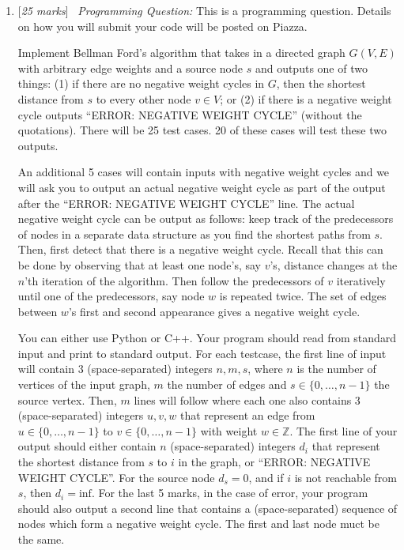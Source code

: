 \documentclass[11pt]{article}
\newcommand{\Q}[1]{\medskip\item {[{\em #1 marks\/}]}\ }
\begin{document}
\begin{enumerate}

\Q{25} {\em Programming Question:} This is a programming question. Details on how you will submit your code will be posted on Piazza.

Implement Bellman Ford's algorithm that takes in a directed graph $G(V, E)$ with arbitrary edge weights and a source node $s$ and outputs one of two things: (1) if there are no negative weight cycles in $G$, then the shortest distance from $s$ to every other node $v \in V$; or (2) if there is a negative weight cycle outputs ``ERROR: NEGATIVE WEIGHT CYCLE'' (without the quotations). There will be 25 test cases. 20 of these cases will test these two outputs. 

An additional 5 cases will contain inputs with negative weight cycles and we will ask you to output an actual negative weight cycle as part of the output after the ``ERROR: NEGATIVE WEIGHT CYCLE'' line. The actual negative weight cycle can be output as follows: keep track of the predecessors of nodes in a separate data structure as you find the shortest paths from $s$. Then, first detect that there is a negative weight cycle. Recall that this can be done by observing that at least one node's, say $v$'s, distance changes at the $n$'th iteration of the algorithm. Then follow the predecessors of $v$ iteratively until one of the predecessors, say node $w$ is repeated twice. The set of edges between $w$'s first and second appearance gives a negative weight cycle.

You can either use Python or C++. Your program should read from standard input and print to standard output. For each testcase, the first line of input will contain 3 (space-separated) integers $n, m, s$, where $n$ is the number of vertices of the input graph, $m$ the number of edges and $s\in\{0,\ldots ,n-1\}$ the source vertex. Then, $m$ lines will follow where each one also contains 3 (space-separated) integers $u, v, w$ that represent an edge from $u\in\{0,\ldots ,n-1\}$ to $v\in\{0,\ldots ,n-1\}$ with weight $w\in\mathbb{Z}$. The first line of your output should either contain $n$ (space-separated) integers $d_i$ that represent the shortest distance from $s$ to $i$ in the graph, or ``ERROR: NEGATIVE WEIGHT CYCLE''. For the source node $d_s=0$, and if $i$ is not reachable from $s$, then $d_i=\text{inf}$. For the last 5 marks, in the case of error, your program should also output a second line that contains a (space-separated) sequence of nodes which form a negative weight cycle. The first and last node muct be the same.


\end{enumerate}
\end{document}
